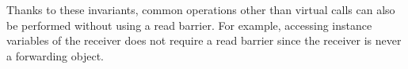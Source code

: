 \documentclass[sigplan,10pt,screen]{acmart}\settopmatter{printfolios=true,printccs=true,printacmref=true}
\newcommand{\egb}[1]{\color{blue}\fbox{\bfseries\sffamily\scriptsize Elisa:}{\sf\small$\blacktriangleright$\textit{#1}$\blacktriangleleft$}\color{black}}
\begin{document}
% 
%
%
Thanks to these invariants, common operations other than virtual calls can also be performed without using a read barrier. For example, accessing instance variables of the receiver does not require a read barrier since the receiver is never a forwarding object.


\end{document}
